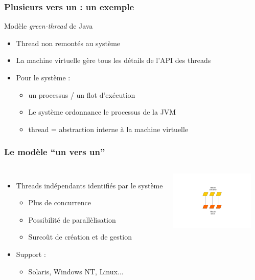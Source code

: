 \begin{frame}
 \frametitle{Plusieurs vers un : un exemple}
 \begin{exampleblock}{Modèle \textit{green-thread} de Java}
 \begin{itemize}
 \item Thread non remontés au système
 \item La machine virtuelle gère tous les détails de l'API des threads
 \item Pour le système : 
 \begin{itemize}
 \item un processus / un flot d’exécution
 \item Le système ordonnance le processus de la JVM
 \item thread = abstraction interne à la machine virtuelle
 \end{itemize}
 \end{itemize}
 \end{exampleblock}
\end{frame}


\begin{frame}
 \frametitle{Le modèle ``un vers un''}
 \begin{columns}
 \begin{itemize}
 \item Threads indépendants identifiés par le système
 \begin{itemize}
 \item Plus de concurrence
 \item Possibilité de parallèlisation
 \item Surcoût de création et de gestion
 \end{itemize}
 \item Support :
 \begin{itemize}
 \item Solaris, Windows NT, Linux...
 \end{itemize}
 \end{itemize}
 \includegraphics[width=4cm]{../illustration/threads-1-1.pdf}
 \end{columns}
\end{frame}


